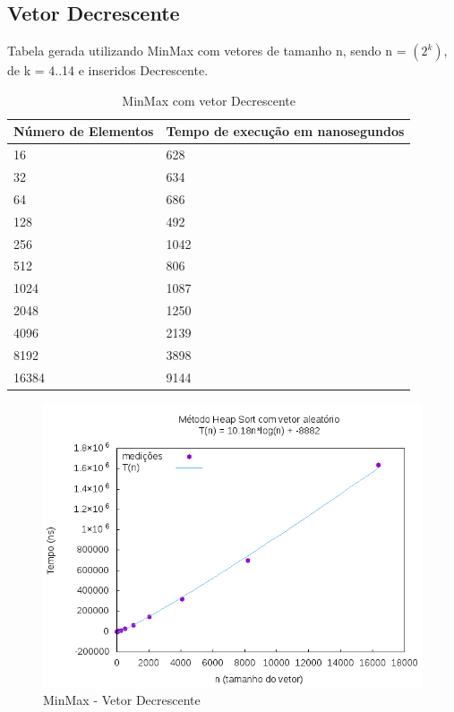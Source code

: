 \documentclass[12pt,a4paper,twoside]{report}
\begin{document}
\subsection{Vetor Decrescente}
Tabela gerada utilizando MinMax com vetores de tamanho n, sendo n = $(2^k)$, de k = 4..14 e inseridos Decrescente.
\begin{table}[H]
\centering
\caption{MinMax com vetor Decrescente}
\label{my-label}
\begin{tabular}{|l|l|}
\hline
\multicolumn{1}{|c|}{\textbf{Número de Elementos}} & \multicolumn{1}{c|}{\textbf{Tempo de execução em nanosegundos}} \\ \hline
16 & 628 \\ \hline
32 & 634 \\ \hline
64 & 686 \\ \hline
128 & 492 \\ \hline
256 & 1042 \\ \hline
512 & 806 \\ \hline
1024 & 1087 \\ \hline
2048 & 1250 \\ \hline
4096 & 2139 \\ \hline
8192 & 3898 \\ \hline
16384 & 9144 \\ \hline
\end{tabular}
\end{table}

\begin{figure}[H]
    \centering
    \includegraphics[width=0.7\linewidth]{graficos/HeapSort/vIntAleatorio/vIntAleatorio.png}
  \caption{MinMax - Vetor Decrescente}
\end{figure}
\end{document}
